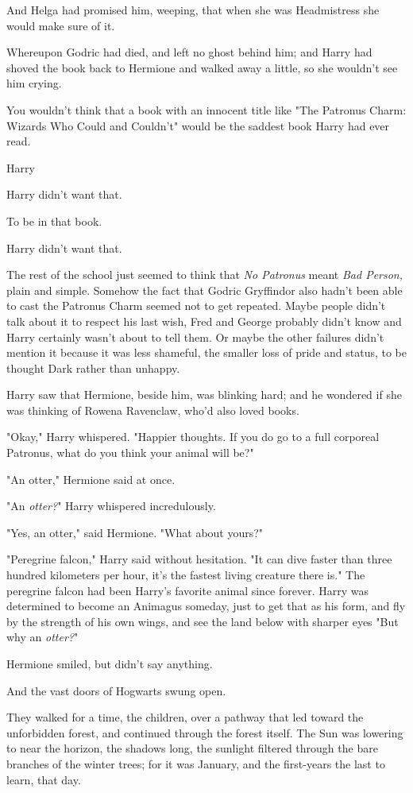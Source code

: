 And Helga had promised him, weeping, that when she was Headmistress she would
make sure of it.

Whereupon Godric had died, and left no ghost behind him; and Harry had shoved
the book back to Hermione and walked away a little, so she wouldn't see him
crying.

You wouldn't think that a book with an innocent title like "The Patronus Charm:
Wizards Who Could and Couldn't" would be the saddest book Harry had ever read.

Harry{\el}

Harry didn't want that.

To be in that book.

Harry didn't want that.

The rest of the school just seemed to think that \emph{No Patronus} meant
\emph{Bad Person,} plain and simple. Somehow the fact that Godric Gryffindor
also hadn't been able to cast the Patronus Charm seemed not to get repeated.
Maybe people didn't talk about it to respect his last wish, Fred and George
probably didn't know and Harry certainly wasn't about to tell them. Or maybe
the other failures didn't mention it because it was less shameful, the smaller
loss of pride and status, to be thought Dark rather than unhappy.

Harry saw that Hermione, beside him, was blinking hard; and he wondered if she
was thinking of Rowena Ravenclaw, who'd also loved books.

"Okay," Harry whispered. "Happier thoughts. If you do go to a full corporeal
Patronus, what do you think your animal will be?"

"An otter," Hermione said at once.

"An \emph{otter?}" Harry whispered incredulously.

"Yes, an otter," said Hermione. "What about yours?"

"Peregrine falcon," Harry said without hesitation. "It can dive faster than
three hundred kilometers per hour, it's the fastest living creature there is."
The peregrine falcon had been Harry's favorite animal since forever. Harry was
determined to become an Animagus someday, just to get that as his form, and fly
by the strength of his own wings, and see the land below with sharper
eyes{\el} "But why an \emph{otter?}"

Hermione smiled, but didn't say anything.

And the vast doors of Hogwarts swung open.

They walked for a time, the children, over a pathway that led toward the
unforbidden forest, and continued through the forest itself. The Sun was
lowering to near the horizon, the shadows long, the sunlight filtered through
the bare branches of the winter trees; for it was January, and the first-years
the last to learn, that day.

